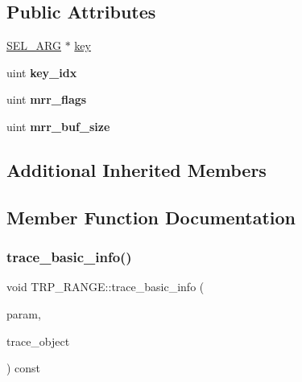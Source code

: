 \subsection*{Public Attributes}
\begin{DoxyCompactItemize}
\item 
\mbox{\hyperlink{classSEL__ARG}{S\+E\+L\+\_\+\+A\+RG}} $\ast$ \mbox{\hyperlink{classTRP__RANGE_a65c1c3bff624f212e4479b6a632f7834}{key}}
\item 
\mbox{\label{classTRP__RANGE_a7546b059a74541f8f73bde528e9a6f4c}} 
uint {\bfseries key\+\_\+idx}
\item 
\mbox{\label{classTRP__RANGE_aa3a989d9c86184943e2ac2388e524fab}} 
uint {\bfseries mrr\+\_\+flags}
\item 
\mbox{\label{classTRP__RANGE_a7b0a701573bd719fc73fcdbc7df05a05}} 
uint {\bfseries mrr\+\_\+buf\+\_\+size}
\end{DoxyCompactItemize}
\subsection*{Additional Inherited Members}


\subsection{Member Function Documentation}
\mbox{\label{classTRP__RANGE_a825eead18ac6efe593cc6bf85006d6d7}} 
\subsubsection{\texorpdfstring{trace\+\_\+basic\+\_\+info()}{trace\_basic\_info()}}
{\footnotesize\ttfamily void T\+R\+P\+\_\+\+R\+A\+N\+G\+E\+::trace\+\_\+basic\+\_\+info (\begin{DoxyParamCaption}\item[{const \mbox{\hyperlink{classPARAM}{P\+A\+R\+AM}} $\ast$}]{param,  }\item[{\mbox{\hyperlink{classOpt__trace__object}{Opt\+\_\+trace\+\_\+object}} $\ast$}]{trace\+\_\+object }\end{DoxyParamCaption}) const\hspace{0.3cm}{\ttfamily [virtual]}}

